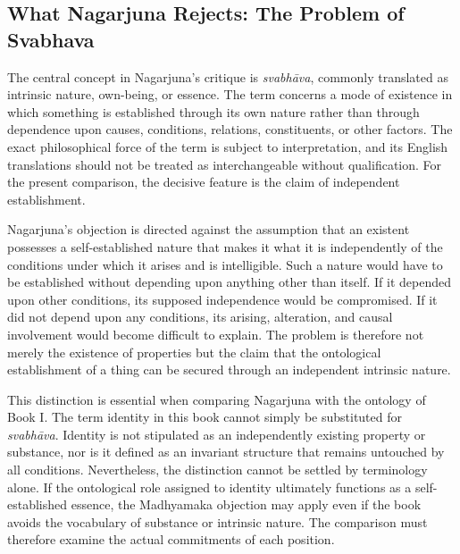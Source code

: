 \subsection{What Nagarjuna Rejects: The Problem of Svabhava}
\label{subsec:ch08_s18_ss03}

\label{para:VS.B01.P01.C08.S18.SS03.P001}
The central concept in Nagarjuna's critique is \emph{svabh\={a}va}, commonly translated as intrinsic nature, own-being, or essence. The term concerns a mode of existence in which something is established through its own nature rather than through dependence upon causes, conditions, relations, constituents, or other factors. The exact philosophical force of the term is subject to interpretation, and its English translations should not be treated as interchangeable without qualification. For the present comparison, the decisive feature is the claim of independent establishment.


\label{para:VS.B01.P01.C08.S18.SS03.P002}
Nagarjuna's objection is directed against the assumption that an existent possesses a self-established nature that makes it what it is independently of the conditions under which it arises and is intelligible. Such a nature would have to be established without depending upon anything other than itself. If it depended upon other conditions, its supposed independence would be compromised. If it did not depend upon any conditions, its arising, alteration, and causal involvement would become difficult to explain. The problem is therefore not merely the existence of properties but the claim that the ontological establishment of a thing can be secured through an independent intrinsic nature.

\label{para:VS.B01.P01.C08.S18.SS03.P003}
This distinction is essential when comparing Nagarjuna with the ontology of Book I. The term identity in this book cannot simply be substituted for \emph{svabh\={a}va}. Identity is not stipulated as an independently existing property or substance, nor is it defined as an invariant structure that remains untouched by all conditions. Nevertheless, the distinction cannot be settled by terminology alone. If the ontological role assigned to identity ultimately functions as a self-established essence, the Madhyamaka objection may apply even if the book avoids the vocabulary of substance or intrinsic nature. The comparison must therefore examine the actual commitments of each position.

